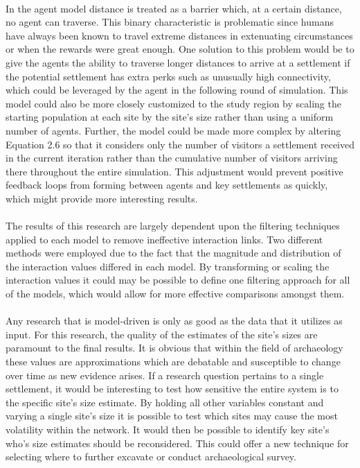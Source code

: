 \documentclass[12pt,a4paper]{thesis}
\begin{document}
\paragraph{}
In the agent model distance is treated as a barrier which, at a certain distance, no agent can traverse. This binary characteristic is problematic since humans have always been known to travel extreme distances in extenuating circumstances or when the rewards were great enough. One solution to this problem would be to give the agents the ability to traverse longer distances to arrive at a settlement if the potential settlement has extra perks such as unusually high connectivity, which could be leveraged by the agent in the following round of simulation. This model could also be more closely customized to the study region by scaling the starting population at each site by the site's size rather than using a uniform number of agents. Further, the model could be made more complex by altering Equation 2.6 so that it considers only the number of visitors a settlement received in the current iteration rather than the cumulative number of visitors arriving there throughout the entire simulation. This adjustment would prevent positive feedback loops from forming between agents and key settlements as quickly, which might provide more interesting results.

\paragraph{}
The results of this research are largely dependent upon the filtering techniques applied to each model to remove ineffective interaction links. Two different methods were employed due to the fact that the magnitude and distribution of the interaction values differed in each model. By transforming or scaling the interaction values it could may be possible to define one filtering approach for all of the models, which would allow for more effective comparisons amongst them.    

\paragraph{}
Any research that is model-driven is only as good as the data that it utilizes as input. For this research, the quality of the estimates of the site's sizes are paramount to the final results. It is obvious that within the field of archaeology these values are approximations which are debatable and susceptible to change over time as new evidence arises. If a research question pertains to a single settlement, it would be interesting to test how sensitive the entire system is to the specific site's size estimate. By holding all other variables constant and varying a single site's size it is possible to test which sites may cause the most volatility within the network. It would then be possible to identify key site's who's size estimates should be reconsidered. This could offer a new technique for selecting where to further excavate or conduct archaeological survey. 
\end{document}
